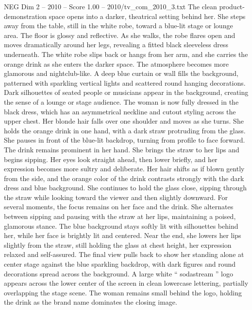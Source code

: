 \begin{textsample}{NEG Dim 2 – 2010 – Score 1.00 – 2010/tv\_com\_2010\_3.txt}
The clean product-demonstration space opens into a darker, theatrical setting behind her.
She steps away from the table, still in the white robe, toward a blue-lit stage or lounge area.
The floor is glossy and reflective.
As she walks, the robe flares open and moves dramatically around her legs, revealing a fitted black sleeveless dress underneath.
The white robe slips back or hangs from her arm, and she carries the orange drink as she enters the darker space.
The atmosphere becomes more glamorous and nightclub-like.
A deep blue curtain or wall fills the background, patterned with sparkling vertical lights and scattered round hanging decorations.
Dark silhouettes of seated people or musicians appear in the background, creating the sense of a lounge or stage audience.
The woman is now fully dressed in the black dress, which has an asymmetrical neckline and cutout styling across the upper chest.
Her blonde hair falls over one shoulder and moves as she turns.
She holds the orange drink in one hand, with a dark straw protruding from the glass.
She pauses in front of the blue-lit backdrop, turning from profile to face forward.
The drink remains prominent in her hand.
She brings the straw to her lips and begins sipping.
Her eyes look straight ahead, then lower briefly, and her expression becomes more sultry and deliberate.
Her hair shifts as if blown gently from the side, and the orange color of the drink contrasts strongly with the dark dress and blue background.
She continues to hold the glass close, sipping through the straw while looking toward the viewer and then slightly downward.
For several moments, the focus remains on her face and the drink.
She alternates between sipping and pausing with the straw at her lips, maintaining a poised, glamorous stance.
The blue background stays softly lit with silhouettes behind her, while her face is brightly lit and centered.
Near the end, she lowers her lips slightly from the straw, still holding the glass at chest height, her expression relaxed and self-assured.
The final view pulls back to show her standing alone at center stage against the blue sparkling backdrop, with dark figures and round decorations spread across the background.
A large white “ sodastream ” logo appears across the lower center of the screen in clean lowercase lettering, partially overlapping the stage scene.
The woman remains small behind the logo, holding the drink as the brand name dominates the closing image.

\end{textsample}

